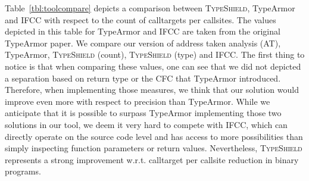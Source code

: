 Table~\ref{tbl:toolcompare} depicts 
a comparison between \textsc{TypeShield}, TypeArmor and IFCC with respect to the count of calltargets per callsites. 
The values depicted in this table for TypeArmor and IFCC are taken from the original TypeArmor paper.
We compare our version of address taken analysis (AT), TypeArmor, \textsc{TypeShield} (count), \textsc{TypeShield} (type) and IFCC. The first 
thing to notice is that when comparing these values, one can see that we did not depicted a separation based on return type or the 
CFC that TypeArmor introduced. Therefore, when implementing those measures, we think that our solution would improve even 
more with respect to precision than TypeArmor. While we anticipate that it is possible to surpass TypeArmor implementing those two solutions 
in our tool, we deem it very hard to compete with IFCC, which can directly operate on the source code level 
and has access to more possibilities than simply inspecting function parameters or return values.
Nevertheless, \textsc{TypeShield} represents a strong improvement w.r.t. calltarget per callsite reduction in binary programs.